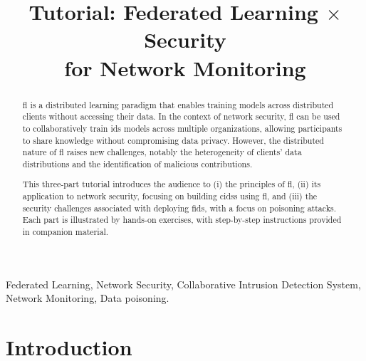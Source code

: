 \documentclass[conference]{IEEEtran}
\begin{document}
\title{Tutorial: Federated Learning $\times$ Security\\ for Network Monitoring}
\author{
\and
{}
}

\maketitle

\begin{abstract}
    \Gls{fl} is a distributed learning paradigm that enables training models across distributed clients without accessing their data.
    In the context of network security, \gls{fl} can be used to collaboratively train \gls{ids} models across multiple organizations, allowing participants to share knowledge without compromising data privacy.
    However, the distributed nature of \gls{fl} raises new challenges, notably the heterogeneity of clients' data distributions and the identification of malicious contributions.
    
    This three-part tutorial introduces the audience to (i) the principles of \gls{fl}, (ii) its application to network security, focusing on building \glspl{cids} using \gls{fl}, and (iii) the security challenges associated with deploying \gls{fids}, with a focus on poisoning attacks.
    Each part is illustrated by hands-on exercises, with step-by-step instructions provided in companion material.
\end{abstract}

\glsresetall

\begin{IEEEkeywords}
Federated Learning, Network Security, Collaborative Intrusion Detection System, Network Monitoring, Data poisoning.
\end{IEEEkeywords}

\section{Introduction} %
\end{document}
